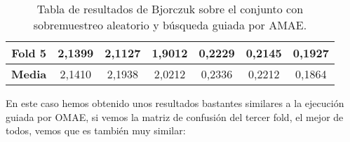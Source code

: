 \begin{table}[H]
{\begin{tabular}{|ccccccc|}
\multicolumn{1}{|c|}{\textbf{Fold 5}}            & \multicolumn{1}{c|}{2,1399}            & \multicolumn{1}{c|}{2,1127}              & \multicolumn{1}{c|}{1,9012}          & \multicolumn{1}{c|}{0,2229}            & \multicolumn{1}{c|}{0,2145}              & 0,1927          \\ \hline
\multicolumn{1}{|c|}{\textbf{Media}}             & \multicolumn{1}{c|}{2,1410}           & \multicolumn{1}{c|}{2,1938}             & \multicolumn{1}{c|}{2,0212}         & \multicolumn{1}{c|}{0,2336}           & \multicolumn{1}{c|}{0,2212}             & 0,1864         \\ \hline
\end{tabular}%
}
\caption{Tabla de resultados de Bjorczuk sobre el conjunto con sobremuestreo aleatorio y búsqueda guiada por AMAE.}\label{tablaBJORCZUKconAMAE}
\end{table}


En este caso hemos obtenido unos resultados bastantes similares a la ejecución guiada por OMAE, si vemos la matriz de confusión del tercer fold, el mejor de todos, vemos que es también muy similar:


